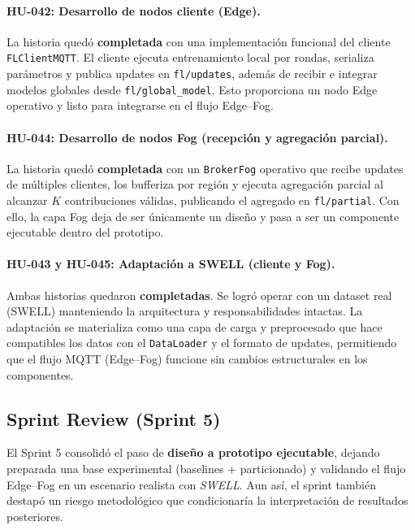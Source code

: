 \documentclass{report}
\begin{document}
\paragraph{HU-042: Desarrollo de nodos cliente (Edge).}
La historia quedó \textbf{completada} con una implementación funcional del cliente \texttt{FLClientMQTT}. El cliente ejecuta entrenamiento local por rondas, serializa parámetros y publica updates en \texttt{fl/updates}, además de recibir e integrar modelos globales desde \texttt{fl/global\_model}. Esto proporciona un nodo Edge operativo y listo para integrarse en el flujo Edge--Fog.

\paragraph{HU-044: Desarrollo de nodos Fog (recepción y agregación parcial).}
La historia quedó \textbf{completada} con un \texttt{BrokerFog} operativo que recibe updates de múltiples clientes, los bufferiza por región y ejecuta agregación parcial al alcanzar $K$ contribuciones válidas, publicando el agregado en \texttt{fl/partial}. Con ello, la capa Fog deja de ser únicamente un diseño y pasa a ser un componente ejecutable dentro del prototipo.

\paragraph{HU-043 y HU-045: Adaptación a SWELL (cliente y Fog).}
Ambas historias quedaron \textbf{completadas}. Se logró operar con un dataset real (SWELL) manteniendo la arquitectura y responsabilidades intactas. La adaptación se materializa como una capa de carga y preprocesado que hace compatibles los datos con el \texttt{DataLoader} y el formato de updates, permitiendo que el flujo MQTT (Edge--Fog) funcione sin cambios estructurales en los componentes.





\subsection{Sprint Review (Sprint 5)}
El Sprint 5 consolidó el paso de \textbf{diseño a prototipo ejecutable}, dejando preparada una base experimental (baselines + particionado) y validando el flujo Edge--Fog en un escenario realista con \textit{SWELL}. Aun así, el sprint también destapó un riesgo metodológico que condicionaría la interpretación de resultados posteriores.
\end{document}
